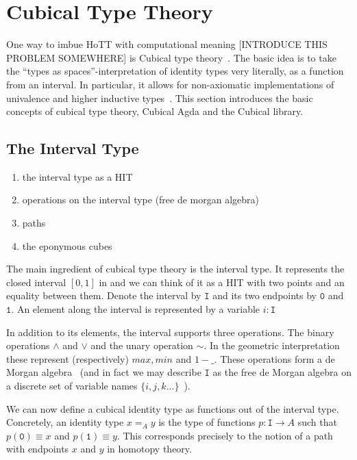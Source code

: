 \section{Cubical Type Theory}

One way to imbue HoTT with computational meaning [INTRODUCE THIS PROBLEM
SOMEWHERE] is Cubical type theory~\cite{cohen2016cubical}. The basic idea is to
take the ``types as spaces''-interpretation of identity types very literally, as
a function from an interval. In particular, it allows for non-axiomatic
implementations of univalence and higher inductive types~\cite{coquand2018higher}. This section
introduces the basic concepts of cubical type theory, Cubical Agda and the
Cubical library.

\subsection{The Interval Type}\label{sec:interval-type}
\begin{enumerate}
  \item the interval type as a HIT
  \item operations on the interval type (free de morgan algebra)
  \item paths
  \item the eponymous cubes
\end{enumerate}

The main ingredient of cubical type theory is the interval type. It represents
the closed interval $[0,1]$ in and we can think of it as a HIT with two points
and an equality between them. Denote the interval by $\texttt{I}$ and its two
endpoints by $\texttt{0}$ and $\texttt{1}$. An element along the interval is
represented by a variable $i : \texttt{I}$

In addition to its elements, the interval supports three operations. The binary
operations $\land$ and $\lor$ and the unary operation $\sim$. In the geometric
interpretation these represent (respectively) $max, min$ and $1 - \_$. These
operations form a de Morgan algebra~\cite{mortberg2020cubical} (and in fact we
may describe $\texttt{I}$ as the free de Morgan algebra on a discrete set of
variable names $\{i, j, k ...\}$~\cite{cohen2016cubical}).

We can now define a cubical identity type as functions out of the interval type.
Concretely, an identity type $x =_A y$ is the type of functions $p : \texttt{I}
\rightarrow A$ such that $p(\texttt{0}) \equiv x$ and $p(\texttt{1}) \equiv y$.
This corresponds precisely to the notion of a path with endpoints $x$ and $y$ in
homotopy theory.

